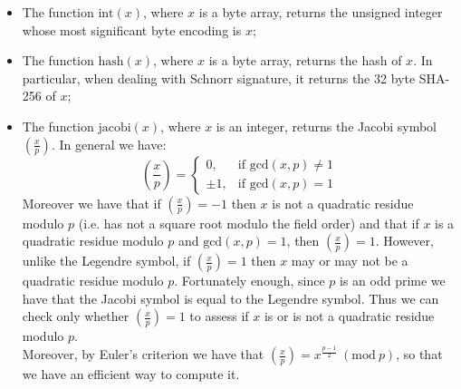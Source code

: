\begin{itemize}
\begin{itemize}
		\item The function $\text{int}(x)$, where $x$ is a byte array, returns the unsigned integer whose most significant byte encoding is $x$;
		\item The function $\text{hash}(x)$, where $x$ is a byte array, returns the hash of $x$. In particular, when dealing with Schnorr signature, it returns the 32 byte SHA-256 of $x$;
		\item The function $\text{jacobi}(x)$, where $x$ is an integer, returns the Jacobi symbol $\left(\frac{x}{p}\right)$. In general we have: $$\left(\frac{x}{p}\right)= \begin{cases} 0, & \text{if gcd}(x, p) \neq 1 \\ \pm 1, & \mbox{if gcd}(x, p) = 1 \end{cases}$$
		Moreover we have that if $\left(\frac{x}{p}\right) = - 1$ then $x$ is not a quadratic residue modulo $p$ (i.e. has not a square root modulo the field order) and that if $x$ is a quadratic residue modulo $p$ and $\text{gcd}(x, p) = 1$, then $\left(\frac{x}{p}\right) = 1$. However, unlike the Legendre symbol, if $\left(\frac{x}{p}\right) = 1$ then $x$ may or may not be a quadratic residue modulo $p$. Fortunately enough, since $p$ is an odd prime we have that the Jacobi symbol is equal to the Legendre symbol. Thus we can check only whether $\left(\frac{x}{p}\right) = 1$ to assess if $x$ is or is not a quadratic residue modulo $p$.
		\\
		Moreover, by Euler's criterion we have that $\left(\frac{x}{p}\right) = x^{\frac{p - 1}{2}} \ (\text{mod} \ p)$, so that we have an efficient way to compute it.
	\end{itemize}	
\end{itemize}